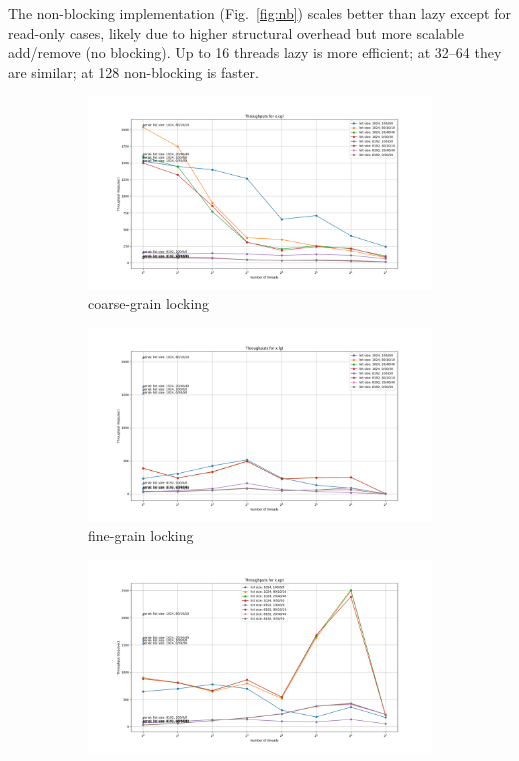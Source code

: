 \documentclass{article}
\newcommand{\eng}[1]{#1}
\begin{document}
The \eng{non-blocking} implementation (Fig.~\ref{fig:nb}) scales better than lazy except for read-only cases, likely due to higher structural overhead but more scalable add/remove (no blocking). Up to 16 threads lazy is more efficient; at 32–64 they are similar; at 128 non-blocking is faster.

\begin{figure}[ht]
    \centering
    \begin{subfigure}{0.45\textwidth}
        \includegraphics[width=\textwidth]{a3/plots/cgl.png}
        \caption{\eng{coarse-grain locking}}
        \label{fig:cgl}
    \end{subfigure}
    \begin{subfigure}{0.45\textwidth}
        \includegraphics[width=\textwidth]{a3/plots/fgl.png}
        \caption{\eng{fine-grain locking}}
        \label{fig:fgl}
    \end{subfigure}
    \vspace{1em}
    \begin{subfigure}{0.45\textwidth}
        \includegraphics[width=\textwidth]{a3/plots/opt.png}

\end{subfigure}
\end{figure}
\end{document}
